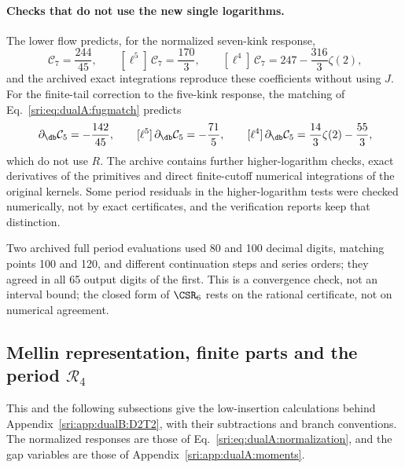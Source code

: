 \paragraph{Checks that do not use the new single logarithms.} The lower flow predicts, for the normalized seven-kink
response,
\begin{equation}
 [\ell^6]\,\mathcal C_7=\frac{244}{45},\qquad [\ell^5]\,\mathcal C_7=\frac{170}{3},\qquad
 [\ell^4]\,\mathcal C_7=247-\frac{316}{3}\zeta(2),
\end{equation}
and the archived exact integrations reproduce these coefficients without using $J$. For the finite-tail correction
to the five-kink response, the matching of Eq.~\eqref{sri:eq:dualA:fugmatch} predicts
\begin{equation}
 [\ell^6]\,\partial_{\db}\mathcal C_5=-\frac{142}{45},\qquad [\ell^5]\,\partial_{\db}\mathcal C_5=-\frac{71}{5},\qquad
 [\ell^4]\,\partial_{\db}\mathcal C_5=\frac{14}{3}\zeta(2)-\frac{55}{3},
\end{equation}
which do not use $R$. The archive contains further higher-logarithm checks, exact derivatives of the primitives and
direct finite-cutoff numerical integrations of the original kernels. Some period residuals in the higher-logarithm
tests were checked numerically, not by exact certificates, and the verification reports keep that distinction.

Two archived full period evaluations used 80 and 100 decimal digits, matching points 100 and 120, and different
continuation steps and series orders; they agreed in all 65 output digits of the first. This is a convergence
check, not an interval bound; the closed form of $\CSR_6$ rests on the rational certificate, not on numerical
agreement.

\subsection{Mellin representation, finite parts and the period \texorpdfstring{$\mathcal R_4$}{R4}}\label{sri:app:dualB:worked}
This and the following subsections give the low-insertion calculations behind Appendix~\ref{sri:app:dualB:D2T2}, with
their subtractions and branch conventions. The normalized responses are those of
Eq.~\eqref{sri:eq:dualA:normalization}, and the gap variables are those of Appendix~\ref{sri:app:dualA:moments}.

